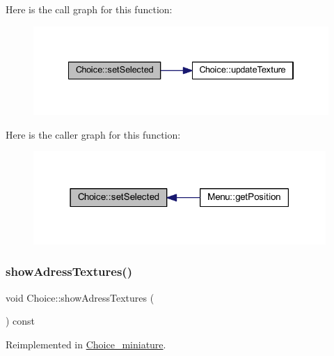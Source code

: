 Here is the call graph for this function\+:\nopagebreak
\begin{figure}[H]
\begin{center}
\leavevmode
\includegraphics[width=334pt]{class_choice_aa4bbe520ca9f933327fc1f678d6626f8_cgraph}
\end{center}
\end{figure}
Here is the caller graph for this function\+:\nopagebreak
\begin{figure}[H]
\begin{center}
\leavevmode
\includegraphics[width=315pt]{class_choice_aa4bbe520ca9f933327fc1f678d6626f8_icgraph}
\end{center}
\end{figure}
\mbox{\label{class_choice_ad29163ceee43a59dba6ea46452ca46c0}} 
\subsubsection{\texorpdfstring{show\+Adress\+Textures()}{showAdressTextures()}}
{\footnotesize\ttfamily void Choice\+::show\+Adress\+Textures (\begin{DoxyParamCaption}{ }\end{DoxyParamCaption}) const\hspace{0.3cm}{\ttfamily [virtual]}}



Reimplemented in \hyperlink{class_choice__miniature_a6f413024d98b0c334c5a3e6ec87eba9b}{Choice\+\_\+miniature}.

